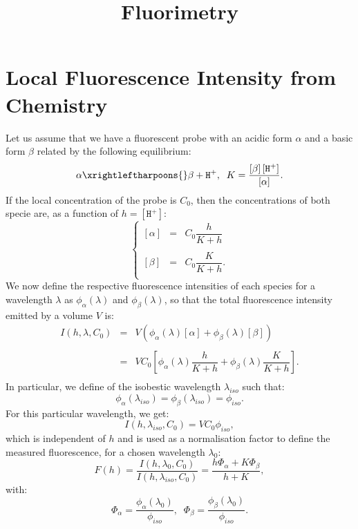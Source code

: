 \documentclass[aps,11pt]{revtex4}
\newcommand{\mychem}[1]{\mathtt{#1}}
\newcommand{\myconc}[1]{\left\lbrack{#1}\right\rbrack}
\newcommand{\plus}{\mychem{+}}
\newcommand{\proton}{\mychem{H}^\plus}
\begin{document}
\title{Fluorimetry}
\maketitle

\section{Local Fluorescence Intensity from Chemistry}
\noindent Let us assume that we have a fluorescent probe with an acidic form $\alpha$ and a basic form $\beta$ related by the following equilibrium:
\begin{equation}
	\alpha \xrightleftharpoons{} \beta + \proton, \;\; K = \dfrac{\myconc{\beta}\myconc{\proton}}{ \myconc{\alpha} }.
\end{equation}
If the local concentration of the probe is $C_0$, then the concentrations of both specie are, as a function of $h   =   \myconc{\proton} $:
\begin{equation}
\left\lbrace
\begin{array}{rcl}
	
	 \myconc{\alpha}  & = & C_0 \dfrac{h}{K+h}\\
	 \\
	 \myconc{\beta}   & = & C_0 \dfrac{K}{K+h}.\\
\end{array}
\right.
\end{equation}
We now   define the respective fluorescence intensities of each species for a wavelength $\lambda$ as $\phi_\alpha(\lambda)$ and $\phi_\beta(\lambda)$,
so that the total fluorescence intensity emitted by a volume $V$ is:
\begin{equation}
\begin{array}{rcl}
	I(h,\lambda,C_0) & = & V \left( \phi_\alpha(\lambda) \myconc{\alpha}  + \phi_\beta(\lambda) \myconc{\beta} \right)\\
	\\
	& = & V C_0 \left[ \phi_\alpha(\lambda) \dfrac{h}{K+h} + \phi_\beta(\lambda) \dfrac{K}{K+h}\right].\\
\end{array}
\end{equation}
In particular, we define of the isobestic wavelength $\lambda_{iso}$ such that:
\begin{equation}
\phi_\alpha(\lambda_{iso})=\phi_\beta(\lambda_{iso})=\phi_{iso}.
\end{equation}
For this particular wavelength, we get:
\begin{equation}
I(h,\lambda_{iso},C_0) = VC_0\phi_{iso},
\end{equation}
which is independent of $h$ and is used as a normalisation factor to define the measured fluorescence, for a chosen wavelength $\lambda_0$:
\begin{equation}
	F(h) = \dfrac{I(h,\lambda_0,C_0)}{I(h,\lambda_{iso},C_0)} = \dfrac{h\Phi_\alpha + K\Phi_\beta}{h+K},
\end{equation}
with:
\begin{equation}
	\Phi_\alpha = \dfrac{\phi_\alpha(\lambda_0)}{\phi_{iso}},\;\;\Phi_\beta = \dfrac{\phi_\beta(\lambda_0)}{\phi_{iso}}.
\end{equation}
\end{document}
